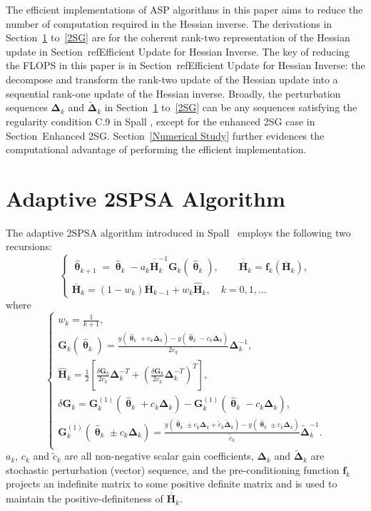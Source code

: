 \documentclass[conference,10.6cpt]{IEEEtran}
\newcommand{\bG}{\bm{G}}
\newcommand{\bDelta}{\bm{\Delta}}
\newcommand{\oH}{\bm{\overline{H}}}
\newcommand{\ooH}{\bm{\overline{\overline{H}}}}
\newcommand{\hH}{\bm{\hat{H}}}
\newcommand{\htheta}{\bm{\hat{\uptheta}}}
\newcommand{\tDelta}{\bm{\tilde{\Delta}}}
\begin{document}
The efficient implementations of ASP algorithms in this paper aims to reduce the number of computation required in the Hessian inverse. The derivations in Section~\ref{2SPSA} to~\ref{2SG} are for the coherent rank-two representation of the Hessian update in Section~ref{Efficient Update for Hessian Inverse}. The key of reducing the FLOPS in this paper is in Section~ref{Efficient Update for Hessian Inverse}: the decompose and transform the rank-two update of the Hessian update into a sequential rank-one update of the Hessian inverse. Broadly, the perturbation sequences $\bDelta_k$ and
$\tDelta_k$ in Section~\ref{2SPSA} to~\ref{2SG} can be any sequences
satisfying the regularity condition C.9 in Spall
\cite{Spall2009}, except for the enhanced 2SG case in Section~{Enhanced 2SG}. Section~\ref{Numerical Study} further evidences the computational advantage of performing the efficient implementation. 

\section{Adaptive 2SPSA Algorithm}
\label{2SPSA}
The adaptive 2SPSA algorithm introduced in Spall~\cite{Spall2000} employs the following
two recursions:
\begin{equation} \label{eq:Adaptation}
  \begin{cases}
    \htheta_{k+1}=\htheta_k-a_k\ooH_k^{-1} \bG_k(\htheta_k),
  \qquad \bm{\ooH}_k=\bm{f}_k(\oH_k),\\ \oH_k= (1 - w_k) \oH_{k-1}+ w_k \hH_k,
 \quad k=0,1,\dots
  \end{cases}
\end{equation}
where
\begin{equation} \label{eq:notations}
  \begin{cases} w_k=\frac{1}{k+1},\\
    \bG_k(\htheta_k)=\frac{y(\htheta_k+c_k\bDelta_k)-y(\htheta_k-c_k\bDelta_k)}{2c_k}\bDelta_k^{-1},\\
    \hH_k=\frac{1}{2}\left[
      \frac{\delta\bG_k}{2c_k}\bDelta_k^{-T}+\left(\frac{\delta\bG_k}{2c_k}\bDelta_k^{-T}\right)^T \right],\\
    \delta\bG_k=\bG_k^{(1)}(\htheta_k+ c_k\bDelta_k)-\bG_k^{(1)}(\htheta_k- c_k\bDelta_k),\\
    \bG_k^{(1)}(\htheta_k\pm c_k\bDelta_k) =\frac{y(\htheta_k\pm c_k\bDelta_k+\tilde{c}_k\tDelta_k)-y(\htheta_k\pm c_k\bDelta_k)}{\tilde{c}_k}\tDelta_k^{-1}.\\
  \end{cases}
\end{equation} $ a_k $, $ c_k $ and $ \tilde{c}_k $ are all
non-negative scalar gain coefficients, $ \bDelta_k $ and $ \tDelta_k $
are stochastic perturbation (vector) sequence, and the
pre-conditioning function $ \bm{f}_k $ projects an indefinite matrix
to some positive definite matrix and is used to maintain the
positive-definiteness of $\ooH_k$.
\end{document}
